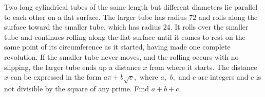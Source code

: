 Two long cylindrical tubes of the same length but different diameters lie parallel to each other on a flat surface. The larger tube has radius $72$ and rolls along the surface toward the smaller tube, which has radius $24$. It rolls over the smaller tube and continues rolling along the flat surface until it comes to rest on the same point of its circumference as it started, having made one complete revolution. If the smaller tube never moves, and the rolling occurs with no slipping, the larger tube ends up a distance $x$ from where it starts. The distance $x$ can be expressed in the form $a\pi+b\sqrt{c},$ where $a,$ $b,$ and $c$ are integers and $c$ is not divisible by the square of any prime. Find $a+b+c.$